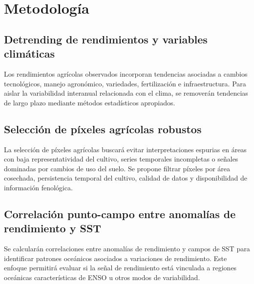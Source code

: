 \section{Metodología}

\subsection{Detrending de rendimientos y variables climáticas}

Los rendimientos agrícolas observados incorporan tendencias asociadas a cambios tecnológicos, manejo agronómico, variedades, fertilización e infraestructura. Para aislar la variabilidad interanual relacionada con el clima, se removerán tendencias de largo plazo mediante métodos estadísticos apropiados.


\subsection{Selección de píxeles agrícolas robustos}

La selección de píxeles agrícolas buscará evitar interpretaciones espurias en áreas con baja representatividad del cultivo, series temporales incompletas o señales dominadas por cambios de uso del suelo. Se propone filtrar píxeles por área cosechada, persistencia temporal del cultivo, calidad de datos y disponibilidad de información fenológica.


\subsection{Correlación punto-campo entre anomalías de rendimiento y SST}

Se calcularán correlaciones entre anomalías de rendimiento y campos de SST para identificar patrones oceánicos asociados a variaciones de rendimiento. Este enfoque permitirá evaluar si la señal de rendimiento está vinculada a regiones oceánicas características de ENSO u otros modos de variabilidad.


